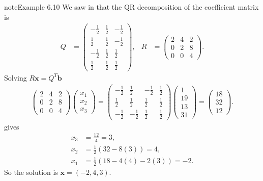 \documentclass[letterpaper,10pt,english]{jupyterBook}
\begin{document}
\begin{sphinxadmonition}{note}{Example 6.10}
\sphinxAtStartPar
We saw in {\hyperref[\detokenize{6_Direct_methods/6.4_QR_decomposition:qr-gramschmidt-example}]{}} that the QR decomposition of the coefficient matrix is
\begin{align*}
    Q &= \begin{pmatrix}
        -\frac{1}{2} & \frac{1}{2} & -\frac{1}{2}\\
        \frac{1}{2} & \frac{1}{2} & -\frac{1}{2}\\
        -\frac{1}{2} & \frac{1}{2} & \frac{1}{2}\\
        \frac{1}{2} & \frac{1}{2} & \frac{1}{2}
    \end{pmatrix}, &
    R &= \begin{pmatrix}
        2 & 4 & 2\\
        0 & 2 & 8\\
        0 & 0 & 4
    \end{pmatrix}.
\end{align*}
\sphinxAtStartPar
Solving \(R\mathbf{x}=Q^T \mathbf{b}\)
\begin{align*}
    \begin{pmatrix}
        2 & 4 & 2\\
        0 & 2 & 8\\
        0 & 0 & 4
    \end{pmatrix}
    \begin{pmatrix} x_1 \\ x_2 \\ x_3 \end{pmatrix} =
    \begin{pmatrix}
        -\frac{1}{2} & \frac{1}{2} & -\frac{1}{2} & \frac{1}{2}\\
        \frac{1}{2} & \frac{1}{2} & \frac{1}{2} & \frac{1}{2}\\
        -\frac{1}{2} & -\frac{1}{2} & \frac{1}{2} & \frac{1}{2}
    \end{pmatrix}
    \begin{pmatrix} 1 \\ 19 \\ 13 \\ 31 \end{pmatrix} = 
    \begin{pmatrix} 18 \\ 32 \\ 12 \end{pmatrix}.
\end{align*}
\sphinxAtStartPar
gives
\begin{align*}
    x_3 &=\frac{12}{4}=3,\\
    x_2 &=\frac{1}{2}(32-8(3))=4,\\
    x_1 &=\frac{1}{2}(18-4(4)-2(3))=-2.
\end{align*}
\sphinxAtStartPar
So the solution is \(\mathbf{x}=(-2,4,3)\).
\end{sphinxadmonition}
\end{document}
